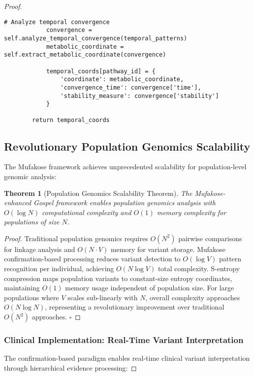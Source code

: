 \documentclass[12pt,a4paper]{article}
\newtheorem{theorem}{Theorem}[section]
\begin{document}
\begin{proof}
\begin{lstlisting}[style=pythonstyle, caption=Temporal Coordinate Optimization]
            # Analyze temporal convergence
            convergence = self.analyze_temporal_convergence(temporal_patterns)
            metabolic_coordinate = self.extract_metabolic_coordinate(convergence)
            
            temporal_coords[pathway_id] = {
                'coordinate': metabolic_coordinate,
                'convergence_time': convergence['time'],
                'stability_measure': convergence['stability']
            }
        
        return temporal_coords
\end{lstlisting}

\subsection{Revolutionary Population Genomics Scalability}

The Mufakose framework achieves unprecedented scalability for population-level genomic analysis:

\begin{theorem}[Population Genomics Scalability Theorem]
The Mufakose-enhanced Gospel framework enables population genomics analysis with $O(\log N)$ computational complexity and $O(1)$ memory complexity for populations of size $N$.
\end{theorem}

\begin{proof}
Traditional population genomics requires $O(N^2)$ pairwise comparisons for linkage analysis and $O(N \cdot V)$ memory for variant storage. Mufakose confirmation-based processing reduces variant detection to $O(\log V)$ pattern recognition per individual, achieving $O(N \log V)$ total complexity. S-entropy compression maps population variants to constant-size entropy coordinates, maintaining $O(1)$ memory usage independent of population size. For large populations where $V$ scales sub-linearly with $N$, overall complexity approaches $O(N \log N)$, representing a revolutionary improvement over traditional $O(N^2)$ approaches. $\square$
\end{proof}

\subsubsection{Clinical Implementation: Real-Time Variant Interpretation}

The confirmation-based paradigm enables real-time clinical variant interpretation through hierarchical evidence processing:


\end{proof}
\end{document}
